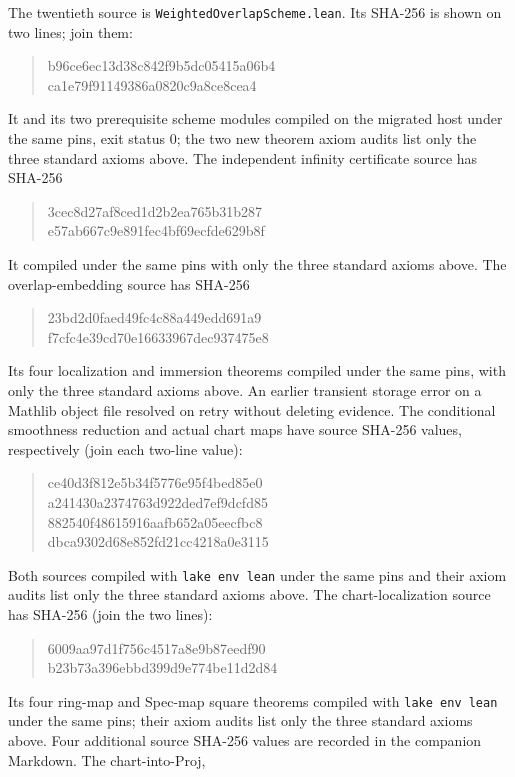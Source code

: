 \documentclass[10pt]{article}
\begin{document}
The twentieth source is \texttt{WeightedOverlapScheme.lean}. Its SHA-256 is shown on two lines; join them:
\begin{quote}\scriptsize\ttfamily
b96ce6ec13d38c842f9b5dc05415a06b4\\
ca1e79f91149386a0820c9a8ce8cea4
\end{quote}
It and its two prerequisite scheme modules compiled on the migrated host under the same pins, exit status 0; the two new theorem axiom audits list only the three standard axioms above.
The independent infinity certificate source has SHA-256
\begin{quote}\scriptsize\ttfamily
3cec8d27af8ced1d2b2ea765b31b287\\
e57ab667c9e891fec4bf69ecfde629b8f
\end{quote}
It compiled under the same pins with only the three standard axioms above.
The overlap-embedding source has SHA-256
\begin{quote}\scriptsize\ttfamily
23bd2d0faed49fc4c88a449edd691a9\\
f7cfc4e39cd70e16633967dec937475e8
\end{quote}
Its four localization and immersion theorems compiled under the same pins,
with only the three standard axioms above. An earlier transient storage error
on a Mathlib object file resolved on retry without deleting evidence.
The conditional smoothness reduction and actual chart maps have source
SHA-256 values, respectively (join each two-line value):
\begin{quote}\scriptsize\ttfamily
ce40d3f812e5b34f5776e95f4bed85e0\\
a241430a2374763d922ded7ef9dcfd85\\
882540f48615916aafb652a05eecfbc8\\
dbca9302d68e852fd21cc4218a0e3115
\end{quote}
Both sources compiled with \texttt{lake env lean} under the same pins and
their axiom audits list only the three standard axioms above.
The chart-localization source has SHA-256 (join the two lines):
\begin{quote}\scriptsize\ttfamily
6009aa97d1f756c4517a8e9b87eedf90\\
b23b73a396ebbd399d9e774be11d2d84
\end{quote}
Its four ring-map and Spec-map square theorems compiled with
\texttt{lake env lean} under the same pins; their axiom audits list only
the three standard axioms above.
Four additional source SHA-256 values are recorded in the companion Markdown. The chart-into-Proj,
\end{document}
